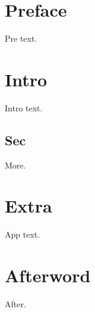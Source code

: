 \documentclass{bookcopy}
\begin{document}
\frontmatter
\chapter{Preface}
Pre text.
\mainmatter
\chapter{Intro}
Intro text.
\section{Sec}
More.
\appendix
\chapter{Extra}
App text.
\backmatter
\chapter{Afterword}
After.
\end{document}
